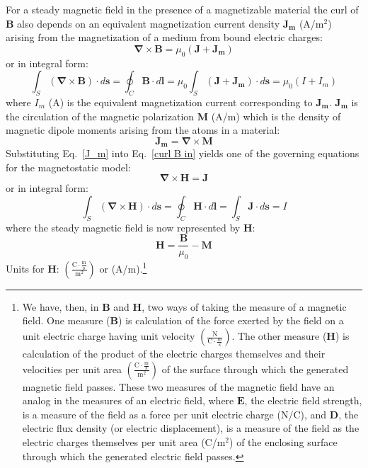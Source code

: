 For a steady magnetic field in the presence of a magnetizable material the curl of $\mathbf{B}$ also depends on an equivalent magnetization current density $\mathbf{J_m}$ (A/m$^2$) arising from the magnetization of a medium from bound electric charges:
\begin{equation}\label{curl B in}
\mathbf{\nabla} \times \mathbf{B} = \mu_0 (\mathbf{J} + \mathbf{J_m})
\end{equation}
or in integral form:
\begin{equation}\label{int B.dl in}
\int_S (\mathbf{\nabla} \times \mathbf{B}) \cdot d\mathbf{s} = \oint_C \mathbf{B} \cdot d\mathbf{l} =  \mu_0 \int_S (\mathbf{J} + \mathbf{J_m}) \cdot d\mathbf{s} = \mu_0 (I + I_m)
\end{equation}
{\noindent}where $I_m$ (A) is the equivalent magnetization current corresponding to $\mathbf{J_m}$. $\mathbf{J_m}$ is the circulation of the magnetic polarization $\mathbf{M}$ (A/m) which is the density of magnetic dipole moments arising from the atoms in a material:
\begin{equation}\label{J_m}
\mathbf{J_m} = \mathbf{\nabla} \times \mathbf{M}
\end{equation}
Substituting Eq.~\ref{J_m} into Eq.~\ref{curl B in} yields one of the governing equations for the magnetostatic model:
\begin{equation}\label{curl H}
\mathbf{\nabla} \times \mathbf{H} = \mathbf{J}
\end{equation}
or in integral form:
\begin{equation}\label{int H.dl}
\int_S (\mathbf{\nabla} \times \mathbf{H}) \cdot d\mathbf{s} = \oint_C \mathbf{H} \cdot d\mathbf{l} =  \int_S \mathbf{J} \cdot d\mathbf{s} = I
\end{equation}
where the steady magnetic field is now represented by $\mathbf{H}$:
\begin{equation}\label{H}
\mathbf{H} = \frac{\mathbf{B}}{\mu_0} - \mathbf{M}
\end{equation}
Units for $\mathbf{H}$: $\left( \frac{\mathrm{C} \cdot \frac{\mathrm{m}}{\mathrm{s}}}{\mathrm{m^2}} \right)$ or (A/m).\footnote{We have, then, in $\mathbf{B}$ and $\mathbf{H}$, two ways of taking the measure of a magnetic field.  One measure ($\mathbf{B}$) is calculation of the force exerted by the field on a unit electric charge having unit velocity $\left( \frac{\mathrm{N}}{\mathrm{C} \cdot \frac{\mathrm{m}}{\mathrm{s}}} \right)$.  The other measure ($\mathbf{H}$) is calculation of the product of  the electric charges themselves and their velocities per unit area $\left( \frac{\mathrm{C} \cdot \frac{\mathrm{m}}{\mathrm{s}}}{\mathrm{m^2}} \right)$ of the surface through which the generated magnetic field passes.  These two measures of the magnetic field have an analog in the measures of an electric field, where $\mathbf{E}$, the electric field strength, is a measure of the field as a force per unit electric charge (N/C), and $\mathbf{D}$, the electric flux density (or electric displacement), is a measure of 
the field as the electric charges themselves per unit area (C/m$^2$) of the enclosing surface through which the generated electric field passes.}\\

